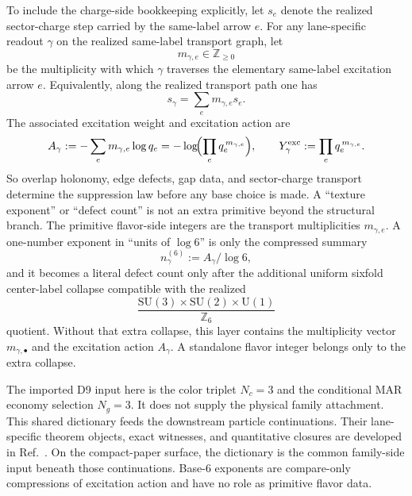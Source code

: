 \documentclass[11pt]{article}
\newcommand{\SU}{\mathrm{SU}}
\newcommand{\U}{\mathrm{U}}
\begin{document}
To include the charge-side bookkeeping explicitly, let \(s_e\) denote the realized sector-charge step carried by the same-label arrow \(e\). For any lane-specific readout \(\gamma\) on the realized same-label transport graph, let
\[
m_{\gamma,e}\in\mathbb Z_{\ge 0}
\]
be the multiplicity with which \(\gamma\) traverses the elementary same-label excitation arrow \(e\). Equivalently, along the realized transport path one has
\[
s_\gamma=\sum_e m_{\gamma,e}s_e.
\]
The associated excitation weight and excitation action are
\[
A_\gamma
:=
-\sum_e m_{\gamma,e}\log q_e
=
-\log\!\Bigl(\prod_e q_e^{\,m_{\gamma,e}}\Bigr),
\qquad
Y_\gamma^{\mathrm{exc}}
:=
\prod_e q_e^{\,m_{\gamma,e}}.
\]
So overlap holonomy, edge defects, gap data, and sector-charge transport determine the suppression law before any base choice is made. A ``texture exponent'' or ``defect count'' is not an extra primitive beyond the structural branch. The primitive flavor-side integers are the transport multiplicities \(m_{\gamma,e}\). A one-number exponent in ``units of \(\log 6\)'' is only the compressed summary
\[
n_\gamma^{(6)}:=A_\gamma/\log 6,
\]
and it becomes a literal defect count only after the additional uniform sixfold center-label collapse compatible with the realized
\[
\frac{\SU(3)\times\SU(2)\times\U(1)}{\mathbb Z_6}
\]
quotient. Without that extra collapse, this layer contains the multiplicity vector
\(m_{\gamma,\bullet}\) and the excitation action \(A_\gamma\). A standalone flavor
integer belongs only to the extra collapse.

The imported D9 input here is the color triplet \(N_c=3\) and the conditional MAR economy selection \(N_g=3\). It does not supply the physical family attachment.
This shared dictionary feeds the downstream particle continuations. Their lane-specific theorem
objects, exact witnesses, and quantitative closures are developed in
Ref.~\cite{ophparticles}. On the compact-paper surface, the dictionary is the common
family-side input beneath those continuations. Base-6 exponents are compare-only
compressions of excitation action and have no role as primitive flavor data.
\end{document}
